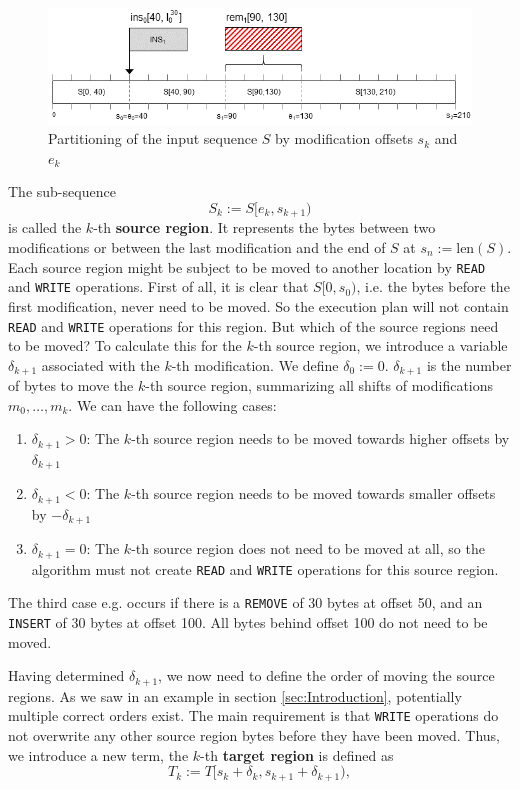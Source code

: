 \documentclass[english, 10pt, openright, twocolumn, landscape, twoside, notitlepage, a4paper, pdftex]		
{article}
\begin{document}
\begin{figure}[htbp]
\centering
\includegraphics[width=1.00\columnwidth]{figures/Key.png}
\caption{Partitioning of the input sequence $S$ by modification offsets $s_{k}$ and $e_{k}$}
\label{fig:Key}
\end{figure}

The sub-sequence \[S_{k}:=S[e_{k},s_{k+1})\] is called the $k$-th \textbf{source region}. It represents the bytes between two modifications or between the last modification and the end of $S$ at $s_{n}:=\text{len}(S)$. Each source region might be subject to be moved to another location by \texttt{READ} and \texttt{WRITE} operations. First of all, it is clear that $S[0, s_{0})$, i.e. the bytes before the first modification, never need to be moved. So the execution plan will not contain \texttt{READ} and \texttt{WRITE} operations for this region. But which of the source regions need to be moved? To calculate this for the $k$-th source region, we introduce a variable $\delta_{k+1}$ associated with the $k$-th modification. We define $\delta_{0}:=0$. $\delta_{k+1}$ is the number of bytes to move the $k$-th source region, summarizing all shifts of modifications $m_{0},\ldots,m_{k}$. We can have the following cases:
\begin{enumerate}
\item $\delta_{k+1}>0$: The $k$-th source region needs to be moved towards higher offsets by $\delta_{k+1}$
\item $\delta_{k+1}<0$: The $k$-th source region needs to be moved towards smaller offsets by $-\delta_{k+1}$
\item $\delta_{k+1}=0$: The $k$-th source region does not need to be moved at all, so the algorithm must not create \texttt{READ} and \texttt{WRITE} operations for this source region.
\end{enumerate}

The third case e.g. occurs if there is a \texttt{REMOVE} of 30 bytes at offset 50, and an \texttt{INSERT} of 30 bytes at offset 100. All bytes behind offset 100 do not need to be moved.

Having determined $\delta_{k+1}$, we now need to define the order of moving the source regions. As we saw in an example in section \ref{sec:Introduction}, potentially multiple correct orders exist. The main requirement is that \texttt{WRITE} operations do not overwrite any other source region bytes before they have been moved. Thus, we introduce a new term, the $k$-th \textbf{target region} is defined as \[T_{k}:=T[s_{k}+\delta_{k},s_{k+1}+\delta_{k+1}),\]
\end{document}
